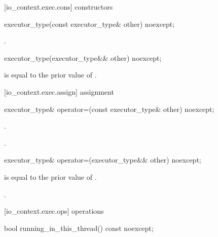 [io_context.exec.cons]{ constructors}

%
\begin{itemdecl}
executor_type(const executor_type& other) noexcept;
\end{itemdecl}

\begin{itemdescr}
\pnum
\postconditions {}.
\end{itemdescr}

\begin{itemdecl}
executor_type(executor_type&& other) noexcept;
\end{itemdecl}

\begin{itemdescr}
\pnum
\postconditions {} is equal to the prior value of .
\end{itemdescr}



[io_context.exec.assign]{ assignment}

%
\begin{itemdecl}
executor_type& operator=(const executor_type& other) noexcept;
\end{itemdecl}

\begin{itemdescr}
\pnum
\postconditions {}.

\pnum
\returns {}.
\end{itemdescr}

\begin{itemdecl}
executor_type& operator=(executor_type&& other) noexcept;
\end{itemdecl}

\begin{itemdescr}
\pnum
\postconditions {} is equal to the prior value of .

\pnum
\returns {}.
\end{itemdescr}



[io_context.exec.ops]{ operations}

%
\begin{itemdecl}
bool running_in_this_thread() const noexcept;
\end{itemdecl}


